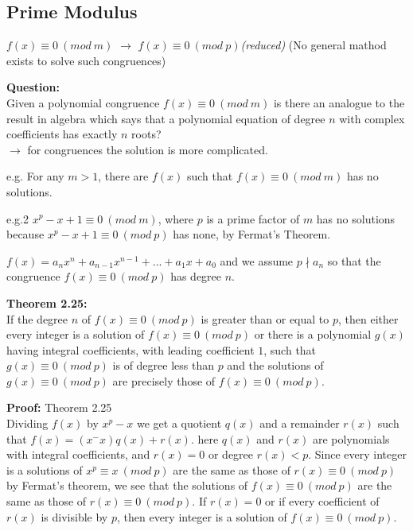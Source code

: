 \documentclass[a4paper]{article}
\begin{document}

\subsection{Prime Modulus}

$f(x)\equiv 0\ (mod\ m)$ $\to$ $f(x)\equiv 0\ (mod\ p)$\quad \textit{(reduced)}
(No general mathod exists to solve such congruences)

\textbf{Question:}\\
Given a polynomial congruence $f(x)\equiv 0\ (mod\ m)$ is there an analogue to
the result in algebra which says that a polynomial equation of degree $n$ with
complex coefficients has exactly $n$ roots?\\
$\to$ for congruences the solution is more complicated.

e.g. For any $m>1$, there are $f(x)$ such that $f(x)\equiv 0\ (mod\ m)$
has no solutions.

e.g.2 $x^p-x+1\equiv 0\ (mod\ m)$, where $p$ is a prime factor of $m$ has no
solutions because $x^p-x+1\equiv 0\ (mod\ p)$ has none, by Fermat's Theorem.

$f(x)=a_nx^n+a_{n-1}x^{n-1}+...+a_1x+a_0$ and we assume $p\nmid a_n$
so that the congruence $f(x)\equiv 0\ (mod\ p)$ has degree $n$.

\textbf{Theorem 2.25:}\\
If the degree $n$ of $f(x)\equiv 0\ (mod\ p)$ is greater than or equal to $p$,
then either every integer is a solution of $f(x)\equiv 0\ (mod\ p)$ or there is
a polynomial $g(x)$ having integral coefficients, with leading coefficient $1$,
such that $g(x)\equiv 0\ (mod\ p)$ is of degree less than $p$ and the solutions
of $g(x)\equiv 0\ (mod\ p)$ are precisely those of $f(x)\equiv 0\ (mod\ p)$.

\textbf{Proof:} Theorem 2.25\\
Dividing $f(x)$ by $x^p-x$ we get a quotient $q(x)$ and a remainder $r(x)$
such that $f(x)=(x^-x)q(x)+r(x)$. here $q(x)$ and $r(x)$ are polynomials
with integral coefficients, and $r(x)=0$ or degree $r(x)<p$. Since every
integer is a solutions of $x^p\equiv x\ (mod\ p)$ are the same as those of
$r(x)\equiv 0\ (mod\ p)$ by Fermat's theorem, we see that the solutions of
$f(x)\equiv 0\ (mod\ p)$ are the same as those of $r(x)\equiv 0\ (mod\ p)$.
If $r(x)=0$ or if every coefficient of $r(x)$ is divisible by $p$, then every
integer is a solution of $f(x)\equiv 0\ (mod\ p)$.
\end{document}
